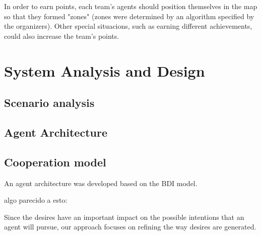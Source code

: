 \documentclass{llncs2e/llncs}
\begin{document}
    In order to earn points, each team's agents should position themselves in the 
    map so that they formed "zones" (zones were determined by an algorithm 
    specified by the organizers). Other special situacions, such as earning 
    different achievements, could also increase the team's points.

\section{System Analysis and Design}

\begin{comment}
PREGUNTAS {
1. If some multi-agent system methodology such as Prometheus, O-MaSE, or 
Tropos was used, how did you use it? 
   If you did not what were the reasons?
2. Is the solution based on the centralisation of coordination/information on 
a specific agent?
   Conversely if you plan a decentralised solution, which strategy do you plan 
to use?
3. What is the communication strategy and how complex is it?
4. How are the following agent features considered/implemented: autonomy, 
proactiveness, reactiveness?
5. Is the team a truly multi-agent system or rather a centralised system in 
disguise?
6. How much time (man hours) have you invested (approximately) for 
implementing your team?
7. Did you discuss the design and strategies of your agent team with other 
developers? 
   To which extent did your test your agents playing with other teams?
}
\end{comment}

\subsection{Scenario analysis}

\subsection{Agent Architecture}

\subsection{Cooperation model}

    An agent architecture was developed based on the BDI model.

    algo parecido a esto:

    Since the desires have an important impact on the possible intentions that an 
    agent will pursue, our approach focuses on refining the way desires are 
    generated.
\end{document}

